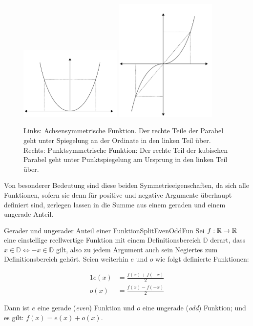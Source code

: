 \begin{figure}
    \centering
    \includegraphics[width=0.45\textwidth]{./svg/axis-symmetric-fun}
    \includegraphics[width=0.45\textwidth]{./svg/point-symmetric-fun}
    \caption[Gerade und ungerade Funktionen]{Links: Achsensymmetrische Funktion. Der rechte Teile der Parabel geht unter Spiegelung an der Ordinate in den linken Teil über. Rechts: Punktsymmetrische Funktion: Der rechte Teil der kubischen Parabel geht unter Punktspiegelung am Ursprung in den linken Teil über.}
    \label{fig:ExAxisSymFun}
\end{figure}

Von besonderer Bedeutung sind diese beiden Symmetrieeigenschaften, da sich alle Funktionen, sofern sie denn für positive und negative Argumente überhaupt definiert sind, zerlegen lassen in die Summe aus einem geraden und einem ungerade Anteil.

\begin{statement}{Gerader und ungerader Anteil einer Funktion}{SplitEvenOddFun}
    Sei $f: \mathbb{R} \to \mathbb{R}$ eine einstellige reellwertige Funktion mit einem Definitionsbereich $\mathbb{D}$ derart, dass $x\in\mathbb{D} \iff -x\in\mathbb{D}$ gilt, also zu jedem Argument auch sein Negiertes zum Definitionsbereich gehört. Seien weiterhin $e$ und $o$ wie folgt definierte Funktionen:

    \begin{alignat*}{1}
        e(x) &= \frac{f(x) + f(-x)}{2} \\
        o(x) &= \frac{f(x) - f(-x)}{2}
    \end{alignat*}

    Dann ist $e$ eine gerade (\emph{even}) Funktion und $o$ eine ungerade (\emph{odd}) Funktion; und es gilt: $f(x) = e(x) + o(x)$.
\end{statement}

